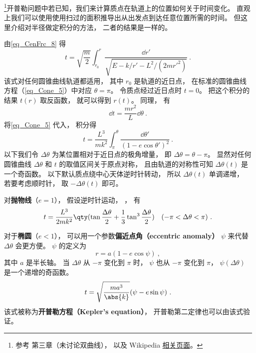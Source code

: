 

\footnote{参考 \cite{Goldstein} 第三章（未讨论双曲线）， 以及 Wikipedia \href{https://en.wikipedia.org/wiki/Kepler's_equation}{相关页面}。 }开普勒问题中若已知，我们来计算质点在轨道上的位置如何关于时间变化。 直观上我们可以使用使用扫过的面积推导出从出发点到达任意位置所需的时间。 但这里介绍对半径做定积分的方法， 二者的结果是一样的。

由\autoref{eq_CenFrc_8} 得
\begin{equation}
t = \sqrt{\frac{m}{2}} \int_{r_0}^r \frac{\dd{r'}}{\sqrt{E - k/r' - L^2/(2mr'^2)}}~.
\end{equation}
该式对任何圆锥曲线轨道都适用， 其中 $r_0$ 是轨道的近日点， 在标准的圆锥曲线方程（\autoref{eq_Cone_5}）中对应 $\theta = \pi$。 令质点经过近日点时 $t= 0$。 把这个积分的结果 $t(r)$ 取反函数， 就可以得到 $r(t)$。 同理， 有
\begin{equation}
\dd{t} = \frac{mr^2}{L}\dd{\theta}~.
\end{equation}
将\autoref{eq_Cone_5} 代入， 积分得
\begin{equation}
t = \frac{L^3}{mk^2} \int_{\pi}^\theta \frac{\dd{\theta'}}{(1 - e\cos \theta')^2 }~.
\end{equation}
以下我们令 $\Delta\theta$ 为某位置相对于近日点的极角增量， 即 $\Delta \theta = \theta - \pi$。 显然对任何圆锥曲线 $\Delta \theta$ 和 $t$ 的取值区间关于原点对称， 且由轨道的对称性可知 $\Delta\theta(t)$ 是一个奇函数。 以下默认质点绕中心天体逆时针转动， 所以 $\Delta\theta(t)$ 单调递增， 若要考虑顺时针， 取 $-\Delta\theta(t)$ 即可。

对\textbf{抛物线}（$e = 1$）， 假设逆时针运动， ， 有
\begin{equation}\label{eq_EqMoKp_3}
t = \frac{L^3}{2mk^2} \qty(\tan\frac{\Delta\theta}{2} +  \frac{1}{3}\tan^3 \frac{\Delta\theta}{2})\quad (-\pi<\Delta\theta<\pi)~.
\end{equation}

对于\textbf{椭圆}（$e < 1$）， 可以用一个参数\textbf{偏近点角（eccentric anomaly）} $\psi$ 来代替 $\Delta\theta$ 会更方便。 $\psi$ 的定义为
\begin{equation}\label{eq_EqMoKp_1}
r = a(1-e\cos\psi)~,
\end{equation}
其中 $a$ 是半长轴。 当 $\Delta\theta $ 从 $-\pi$ 变化到 $\pi$ 时， $\psi$ 也从 $-\pi$ 变化到 $\pi$， $\psi(\Delta\theta)$ 是一个递增的奇函数。
\begin{equation}\label{eq_EqMoKp_5}
t = \sqrt{\frac{ma^3}{\abs{k}}} (\psi - e \sin\psi)~.
\end{equation}
该式被称为\textbf{开普勒方程（Kepler's equation）}， 开普勒第二定律也可以由该式验证。


